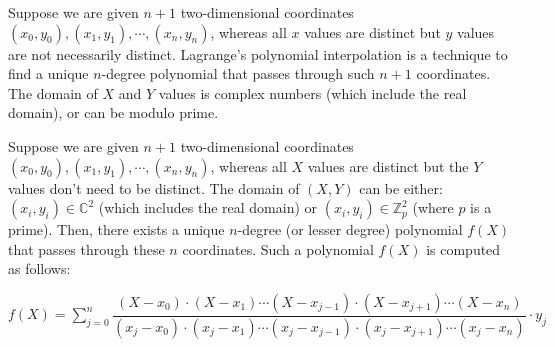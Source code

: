 Suppose we are given $n+1$ two-dimensional coordinates $(x_0, y_0), (x_1, y_1), \cdots, (x_n, y_n)$, whereas all $x$ values are distinct but $y$ values are not necessarily distinct. Lagrange's polynomial interpolation is a technique to find a unique $n$-degree polynomial that passes through such $n+1$ coordinates. The domain of $X$ and $Y$ values is complex numbers (which include the real domain), or can be modulo prime.


\begin{tcolorbox}[title={\textbf{\tboxtheorem{\ref*{sec:polynomial-interpolation}} Lagrange's Polynomial Interpolation}}]

Suppose we are given $n+1$ two-dimensional coordinates $(x_0, y_0), (x_1, y_1), \cdots, (x_n, y_n)$, whereas all $X$ values are distinct but the $Y$ values don't need to be distinct. The domain of $(X, Y)$ can be either: $(x_i, y_i) \in \mathbb{C}^2$ (which includes the real domain) or $(x_i, y_i) \in \mathbb{Z}_p^2$ (where $p$ is a prime). Then, there exists a unique $n$-degree (or lesser degree) polynomial $f(X)$ that passes through these $n$ coordinates. Such a polynomial $f(X)$ is computed as follows:

$f(X) = \sum\limits_{j=0}^{n}\dfrac{(X-x_0)\cdot(X-x_1)\cdots(X-x_{j-1})\cdot(X-x_{j+1})\cdots(X-x_{n})}{(x_j-x_0)\cdot(x_j-x_1)\cdots(x_j-x_{j-1})\cdot(x_j-x_{j+1})\cdots(x_j-x_{n})}\cdot y_j$


\end{tcolorbox}

